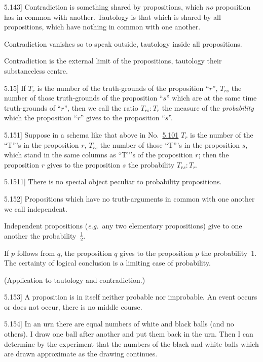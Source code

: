 \documentclass[12pt,oneside]{book}[2007/10/19]
\newcommand{\PropositionE}[2]{%
  \item[\phantomsection\label{PropE:#1}\PropGRef{#1}] #2%
}
\newcommand{\PropERef}[1]{\hyperref[PropE:#1]{#1}}
\newcommand{\PropGRef}[1]{\hyperref[PropG:#1]{#1}}
\newcommand{\exempliGratia}{\textit{e.g.}}
\begin{document}
\begin{propositions}
\PropositionE{5.143}
{Contradiction is something shared by propositions,
which \emph{no} proposition has in common with
another. Tautology is that which is shared by
all propositions, which have nothing in common
with one another.

Contradiction vanishes so to speak outside,
tautology inside all propositions.

Contradiction is the external limit of the propositions,
tautology their substanceless centre.}


\PropositionE{5.15}
{If $T_{r}$ is the number of the truth-grounds of the
proposition ``$r$'', $T_{rs}$ the number of those truth-grounds
of the proposition ``$s$'' which are at the
same time truth-grounds of ``$r$'', then we call the
ratio $T_{rs} : T_{r}$ the measure of the \emph{probability} which
the proposition ``$r$'' gives to the proposition ``$s$''.}


\PropositionE{5.151}
{Suppose in a schema like that above in No.~\PropERef{5.101}
$T_{r}$ is the number of the ``T'''s in the proposition
$r$, $T_{rs}$ the number of those ``T'''s in
the proposition $s$, which stand in the same columns
as ``T'''s of the proposition $r$; then the proposition
$r$ gives to the proposition $s$ the probability
$T_{rs} : T_{r}$.}


\PropositionE{5.1511}
{There is no special object peculiar to probability
propositions.}


\PropositionE{5.152}
{Propositions which have no truth-arguments
in common with one another we call independent.
\enlargethispage{-3pt} %

Independent propositions (\exempliGratia\ any two elementary
propositions) give to one another the probability~$\frac{1}{2}$.

If $p$ follows from $q$, the proposition $q$ gives
to the proposition $p$ the probability~1. The
certainty of logical conclusion is a limiting case
of probability.

(Application to tautology and contradiction.)}


\PropositionE{5.153}
{A proposition is in itself neither probable nor
improbable. An event occurs or does not occur,
there is no middle course.}


\PropositionE{5.154}
{In an urn there are equal numbers of white
and black balls (and no others). I draw one
ball after another and put them back in the
urn. Then I can determine by the experiment
that the numbers of the black and white balls
which are drawn approximate as the drawing
continues.

}
\end{propositions}
\end{document}
